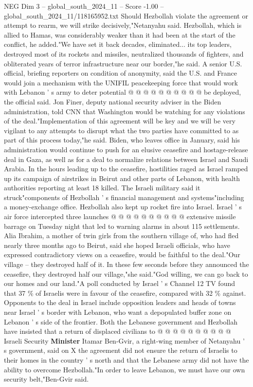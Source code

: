 \begin{textsample}{NEG Dim 3 – global\_south\_2024\_11 – Score -1.00 – global\_south\_2024\_11/118165952.txt}
Should Hezbollah violate the agreement or attempt to rearm, we will strike decisively,"Netanyahu said.
Hezbollah, which is allied to Hamas, was considerably weaker than it had been at the start of the conflict, he added."We have set it back decades, eliminated... its top leaders, destroyed most of its rockets and missiles, neutralized thousands of fighters, and obliterated years of terror infrastructure near our border,"he said.
A senior U.S. official, briefing reporters on condition of anonymity, said the U.S. and France would join a mechanism with the UNIFIL peacekeeping force that would work with Lebanon ' s army to deter potential @ @ @ @ @ @ @ @ @ @ be deployed, the official said.
Jon Finer, deputy national security adviser in the Biden administration, told CNN that Washington would be watching for any violations of the deal."Implementation of this agreement will be key and we will be very vigilant to any attempts to disrupt what the two parties have committed to as part of this process today,"he said.
Biden, who leaves office in January, said his administration would continue to push for an elusive ceasefire and hostage-release deal in Gaza, as well as for a deal to normalize relations between Israel and Saudi Arabia.
In the hours leading up to the ceasefire, hostilities raged as Israel ramped up its campaign of airstrikes in Beirut and other parts of Lebanon, with health authorities reporting at least 18 killed.
The Israeli military said it struck"components of Hezbollah ' s financial management and systems"including a money-exchange office.
Hezbollah also kept up rocket fire into Israel.
Israel ' s air force intercepted three launches @ @ @ @ @ @ @ @ @ @ extensive missile barrage on Tuesday night that led to warning alarms in about 115 settlements.
Alia Ibrahim, a mother of twin girls from the southern village of, who had fled nearly three months ago to Beirut, said she hoped Israeli officials, who have expressed contradictory views on a ceasefire, would be faithful to the deal."Our village -- they destroyed half of it.
In these few seconds before they announced the ceasefire, they destroyed half our village,"she said."God willing, we can go back to our homes and our land."A poll conducted by Israel ' s Channel 12 TV found that 37 \% of Israelis were in favour of the ceasefire, compared with 32 \% against.
Opponents to the deal in Israel include opposition leaders and heads of towns near Israel ' s border with Lebanon, who want a depopulated buffer zone on Lebanon ' s side of the frontier.
Both the Lebanese government and Hezbollah have insisted that a return of displaced civilians to @ @ @ @ @ @ @ @ @ @ Israeli Security \textbf{Minister} Itamar Ben-Gvir, a right-wing member of Netanyahu ' s government, said on X the agreement did not ensure the return of Israelis to their homes in the country ' s north and that the Lebanese army did not have the ability to overcome Hezbollah."In order to leave Lebanon, we must have our own security belt,"Ben-Gvir said.

\end{textsample}

